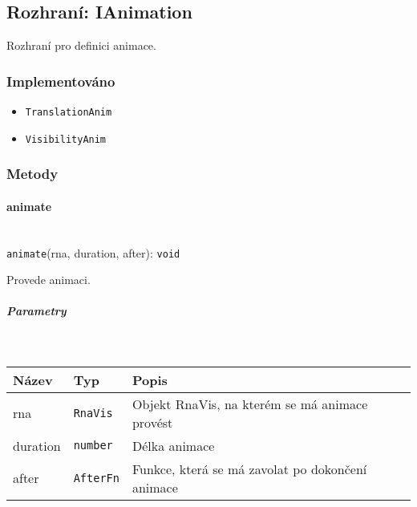 \subsection{Rozhraní: IAnimation}

Rozhraní pro definici animace.

\subsubsection{Implementováno}

\begin{itemize}
  \item \texttt{TranslationAnim}
  \item \texttt{VisibilityAnim}
\end{itemize}

\subsubsection{Metody}

\paragraph{animate}\mbox{}\\

\texttt{animate}(rna, duration, after): \texttt{void}

Provede animaci.

\subparagraph{Parametry}\mbox{}\\

\begin{tabular}{|l|l|p{8cm}|}
  \hline
  Název & Typ & Popis \\ \hline
  rna & \texttt{RnaVis} & Objekt RnaVis, na kterém se má animace provést \\ \hline
  duration & \texttt{number} & Délka animace \\ \hline
  after & \texttt{AfterFn} & Funkce, která se má zavolat po dokončení animace \\ \hline
\end{tabular}
